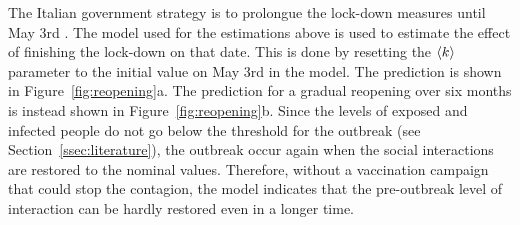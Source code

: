 The Italian government strategy is to prolongue the lock-down measures until May 3rd \cite{DPCM-1004}. The model used for the estimations above is used to estimate the effect of finishing the lock-down on that date. This is done by resetting the $\braket{k}$ parameter to the initial value on May 3rd in the model. The prediction is shown in Figure~\ref{fig:reopening}a. The prediction for a gradual reopening over six months is instead shown in Figure~\ref{fig:reopening}b. Since the levels of exposed and infected people do not go below the threshold for the outbreak (see Section~\ref{ssec:literature}), the outbreak occur again when the social interactions are restored to the nominal values. Therefore, without a vaccination campaign that could stop the contagion, the model indicates that the pre-outbreak level of interaction can be hardly restored even in a longer time.